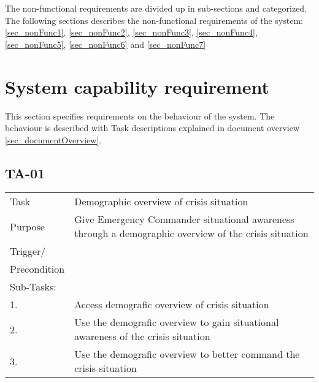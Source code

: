 The non-functional requirements are divided up in sub-sections and categorized. The following sections describes the non-functional requirements of the system: \ref{sec_nonFunc1}, \ref{sec_nonFunc2}, \ref{sec_nonFunc3}, \ref{sec_nonFunc4}, \ref{sec_nonFunc5}, \ref{sec_nonFunc6} and \ref{sec_nonFunc7} 



\newpage
\label{sec_functional}
\section{System capability requirement}
This section specifies requirements on the behaviour of the system. The behaviour is described with Task descriptions explained in document overview \ref{sec_documentOverview}.

\subsection{TA-01}
\begin{longtable}{| p{2.5cm}  | p{10cm} |  }
	\hline
	Task & Demographic overview of crisis situation  \\
	Purpose &  Give Emergency Commander situational awareness through a demographic overview of the crisis situation \\
	Trigger/ &  \\ Precondition &  \\
	\hline
	Sub-Tasks: & \\
	1. & Access demografic overview of crisis situation \\
	\hline
	2. & Use the demografic overview to gain situational awareness of the crisis situation \\
	\hline
	3. & Use the demografic overview to better command the crisis situation \\
	\hline
\end{longtable}



